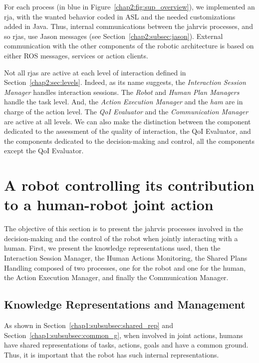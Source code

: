 \documentclass[a4paper,11pt,twoside]{StyleThese}
\begin{document}
For each process (in blue in Figure~\ref{chap2:fig:sup_overview}), we implemented an \acrshort{rja}, with the wanted behavior coded in ASL and the needed customizations added in Java. Thus, internal communications between the \acrshort{jahrvis} processes, and so \acrshort{rja}s, use Jason messages (see Section~\ref{chap2:subsec:jason}). External communication with the other components of the robotic architecture is based on either ROS messages, services or action clients.

Not all \acrshort{rja}s are active at each level of interaction defined in Section~\ref{chap2:sec:levels}. Indeed, as its name suggests, the \textit{Interaction Session Manager} handles interaction sessions. The \textit{Robot} and \textit{Human Plan Managers} handle the task level. And, the \textit{Action Execution Manager} and the \textit{\acrlong{ham}} are in charge of the action level. The \textit{QoI Evaluator} and the \textit{Communication Manager} are active at all levels. We can also make the distinction between the component dedicated to the assessment of the quality of interaction, \ie the QoI Evaluator, and the components dedicated to the decision-making and control, \ie all the components except the QoI Evaluator.


\section{A robot controlling its contribution to a human-robot joint action}\label{chap2:sec:control}

The objective of this section is to present the \acrshort{jahrvis} processes involved in the decision-making and the control of the robot when jointly interacting with a human. First, we present the knowledge representations used, then the Interaction Session Manager, the Human Actions Monitoring, the Shared Plans Handling composed of two processes, one for the robot and one for the human, the Action Execution Manager, and finally the Communication Manager.

\subsection{Knowledge Representations and Management}\label{chap2:subsec:know}
As shown in Section~\ref{chap1:subsubsec:shared_rep} and Section~\ref{chap1:subsubsec:common_g}, when involved in joint actions, humans have shared representations of tasks, actions, goals and have a common ground. Thus, it is important that the robot has such internal representations.
\end{document}

